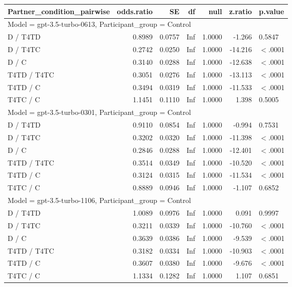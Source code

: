 \begin{table}[ht]
\centering
\begin{tabular}{lrrrrrl}
  \hline
Partner\_condition\_pairwise & odds.ratio & SE & df & null & z.ratio & p.value \\ 
  \hline
\multicolumn{7}{l}{Model = gpt-3.5-turbo-0613, Participant_group = Control}\\
D / T4TD & 0.8989 & 0.0757 & Inf & 1.0000 & -1.266 & 0.5847 \\ 
  D / T4TC & 0.2742 & 0.0250 & Inf & 1.0000 & -14.216 & $<$.0001 \\ 
  D / C & 0.3140 & 0.0288 & Inf & 1.0000 & -12.638 & $<$.0001 \\ 
  T4TD / T4TC & 0.3051 & 0.0276 & Inf & 1.0000 & -13.113 & $<$.0001 \\ 
  T4TD / C & 0.3494 & 0.0319 & Inf & 1.0000 & -11.533 & $<$.0001 \\ 
  T4TC / C & 1.1451 & 0.1110 & Inf & 1.0000 & 1.398 & 0.5005 \\ 
   \hline
\multicolumn{7}{l}{Model = gpt-3.5-turbo-0301, Participant_group = Control}\\
D / T4TD & 0.9110 & 0.0854 & Inf & 1.0000 & -0.994 & 0.7531 \\ 
  D / T4TC & 0.3202 & 0.0320 & Inf & 1.0000 & -11.398 & $<$.0001 \\ 
  D / C & 0.2846 & 0.0288 & Inf & 1.0000 & -12.401 & $<$.0001 \\ 
  T4TD / T4TC & 0.3514 & 0.0349 & Inf & 1.0000 & -10.520 & $<$.0001 \\ 
  T4TD / C & 0.3124 & 0.0315 & Inf & 1.0000 & -11.534 & $<$.0001 \\ 
  T4TC / C & 0.8889 & 0.0946 & Inf & 1.0000 & -1.107 & 0.6852 \\ 
   \hline
\multicolumn{7}{l}{Model = gpt-3.5-turbo-1106, Participant_group = Control}\\
D / T4TD & 1.0089 & 0.0976 & Inf & 1.0000 & 0.091 & 0.9997 \\ 
  D / T4TC & 0.3211 & 0.0339 & Inf & 1.0000 & -10.760 & $<$.0001 \\ 
  D / C & 0.3639 & 0.0386 & Inf & 1.0000 & -9.539 & $<$.0001 \\ 
  T4TD / T4TC & 0.3182 & 0.0334 & Inf & 1.0000 & -10.903 & $<$.0001 \\ 
  T4TD / C & 0.3607 & 0.0380 & Inf & 1.0000 & -9.676 & $<$.0001 \\ 
  T4TC / C & 1.1334 & 0.1282 & Inf & 1.0000 & 1.107 & 0.6851 \\ 

\end{tabular}
\end{table}
